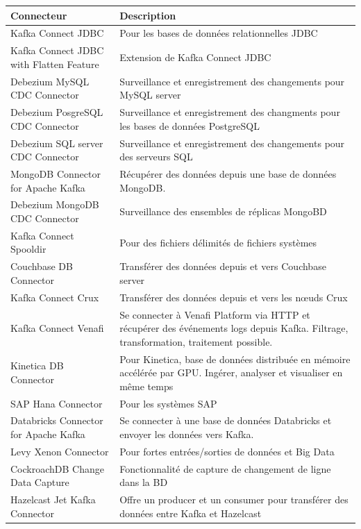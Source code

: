 \documentclass[11pt]{article}
\begin{document}
			\begin{longtable}{|p{7.5cm}|p{7.5cm}|}
				\hline
				\rowcolor{lightgray} Connecteur & Description\\\hline
				\endhead
				Kafka Connect JDBC & Pour les bases de données relationnelles JDBC\\\hline
				Kafka Connect JDBC with Flatten Feature & Extension de Kafka Connect JDBC\\\hline
				Debezium MySQL CDC Connector & Surveillance et enregistrement des changements pour MySQL server\\\hline
				Debezium PosgreSQL CDC Connector & Surveillance et enregistrement des changments pour les bases de données PostgreSQL\\\hline
				Debezium SQL server CDC Connector & Surveillance et enregistrement des changements pour des serveurs SQL\\\hline
				MongoDB Connector for Apache Kafka & Récupérer des données depuis une base de données MongoDB.\\\hline
				Debezium MongoDB CDC Connector & Surveillance des ensembles de réplicas MongoBD\\\hline
				Kafka Connect Spooldir & Pour des fichiers délimités de fichiers systèmes\\\hline
				Couchbase DB Connector & Transférer des données depuis et vers Couchbase server\\\hline
				Kafka Connect Crux & Transférer des données depuis et vers les nœuds Crux\\\hline
				Kafka Connect Venafi & Se connecter à Venafi Platform via HTTP et récupérer des événements logs depuis Kafka. Filtrage, transformation, traitement possible.\\\hline
				Kinetica DB Connector & Pour Kinetica, base de données distribuée en mémoire accélérée par GPU. Ingérer, analyser et visualiser en même temps\\\hline
				SAP Hana Connector & Pour les systèmes SAP\\\hline
				Databricks Connector for Apache Kafka & Se connecter à une base de données Databricks et envoyer les données vers Kafka.\\\hline
				Levy Xenon Connector & Pour fortes entrées/sorties de données et Big Data\\\hline
				CockroachDB Change Data Capture & Fonctionnalité de capture de changement de ligne dans la BD\\\hline
				Hazelcast Jet Kafka Connector & Offre un producer et un consumer pour transférer des données entre Kafka et Hazelcast\\\hline

\end{longtable}
\end{document}
